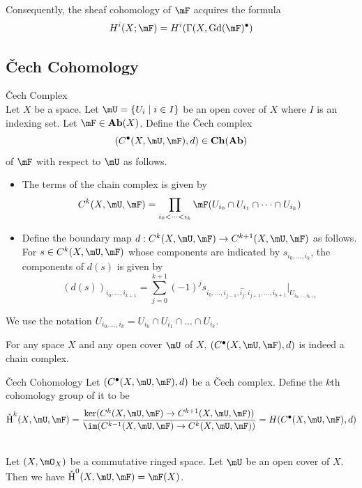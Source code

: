\documentclass[a4paper]{article}
\begin{document}
Consequently, the sheaf cohomology of $\mF$ acquires the formula $$H^i(X;\mF)=H^i(\Gamma(X,\text{Gd}(\mF)^\bullet)$$

\subsection{\v{C}ech Cohomology}
\begin{defn}{\v{C}ech Complex}{}\\
Let $X$ be a space. Let $\mU=\{U_i\;|\;i\in I\}$ be an open cover of $X$ where $I$ is an indexing set. Let $\mF\in\bold{Ab}(X)$. Define the \v{C}ech complex $$(C^\bullet(X,\mU,\mF),d)\in\bold{Ch}(\bold{Ab})$$ of $\mF$ with respect to $\mU$ as follows. 
\begin{itemize}
\item The terms of the chain complex is given by $$C^k(X,\mU,\mF)=\prod_{i_0<\cdots<i_k}\mF(U_{i_0}\cap U_{i_1}\cap\dots\cap U_{i_k})$$
\item Define the boundary map $d:C^k(X,\mU,\mF)\to C^{k+1}(X,\mU,\mF)$ as follows. For $s\in C^k(X,\mU,\mF)$ whose components are indicated by $s_{i_0,\dots,i_k}$, the components of $d(s)$ is given by $$(d(s))_{i_0,\dots,i_{k+1}}=\sum_{j=0}^{k+1}(-1)^js_{i_0,\dots,i_{j-1},\widehat{i_j},i_{j+1},\dots,i_{k+1}}|_{U_{i_0,\dots,i_{k+1}}}$$
\end{itemize}
\end{defn}

We use the notation $U_{i_0,\dots,i_k}=U_{i_0}\cap U_{i_1}\cap\dots\cap U_{i_k}$. 

\begin{lmm}{}{} For any space $X$ and any open cover $\mU$ of $X$, $(C^\bullet(X,\mU,\mF),d)$ is indeed a chain complex. 
\end{lmm}

\begin{defn}{\v{C}ech Cohomology}{} Let $(C^\bullet(X,\mU,\mF),d)$ be a \v{C}ech complex. Define the $k$th cohomology group of it to be $$\text{\v{H}}^k(X,\mU,\mF)=\frac{\ker(C^k(X,\mU,\mF)\to C^{k+1}(X,\mU,\mF))}{\im(C^{k-1}(X,\mU,\mF)\to C^k(X,\mU,\mF))}=H(C^\bullet(X,\mU,\mF),d)$$
\end{defn}

\begin{lmm}{}{}\\
Let $(X,\mO_X)$ be a commutative ringed space. Let $\mU$ be an open cover of $X$. Then we have $\text{\v{H}}^0(X,\mU,\mF)=\mF(X)$. 
\end{lmm}
\end{document}
